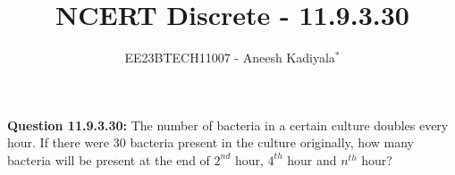 \documentclass[journal,12pt,twocolumn]{IEEEtran}
\theoremstyle{remark}
\begin{document}

\vspace{3cm}

\title{NCERT Discrete - 11.9.3.30}
\author{EE23BTECH11007 - Aneesh Kadiyala$^{*}$%
}
\maketitle
\newpage
\bigskip

\renewcommand{\thefigure}{\theenumi}
\renewcommand{\thetable}{\theenumi}

\vspace{3cm}
\textbf{Question 11.9.3.30:} The number of bacteria in a certain culture doubles every hour. If there were 30 bacteria present in the culture originally, how many bacteria will be present at the end of $2^{nd}$ hour, $4^{th}$ hour and $n^{th}$ hour?
\\
\solution
\end{document}
